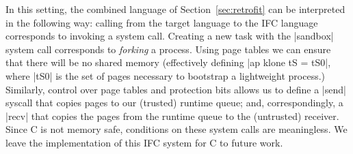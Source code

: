 In this setting, the combined language of Section~\ref{sec:retrofit}
can be interpreted in the following way: calling from the target
language to the IFC language corresponds to invoking a system call.
%
Creating a new task with the |sandbox| system call corresponds to
\emph{forking} a process.  Using page tables we can ensure that
there will be no shared memory
(effectively
defining |ap klone tS
= tS0|, where |tS0| is the set of pages necessary to bootstrap a
lightweight process.)
%
Similarly, control over page tables and protection bits allows us to
define a |send| syscall that copies pages to our
(trusted) runtime queue; and, correspondingly, a |recv| that copies
the pages from the runtime queue to the (untrusted) receiver.
%
Since C is not memory safe, conditions on these system calls are
meaningless.
%
We leave the implementation of this IFC system for C to future work.
